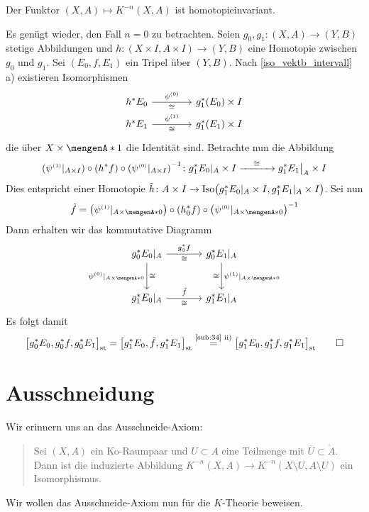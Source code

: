 \begin{lemma}[label=sub:36,{name=[Homotopieinvarinaz]}]
Der Funktor $(X,A) \mapsto K^{-n}(X,A)$ ist homotopieinvariant.
\end{lemma}
\begin{beweis}
Es genügt wieder, den Fall $n=0$ zu betrachten. Seien $g_0,g_1 \colon (X,A) \to (Y,B)$ stetige Abbildungen und $h \colon (X \times I,A \times I) \to (Y,B)$ eine Homotopie 
zwischen $g_0$ und $g_1$. Sei $(E_0,f,E_1)$ ein Tripel über $(Y,B)$. Nach \autoref{iso_vektb_intervall} a) existieren Isomorphismen
\[
	\begin{tikzcd}[column sep=4em, row sep=0.5em]
		h^* E_0 \rar["\psi^\ssbrace{0}","\cong"'] & g_1^*(E_0) \times I \\
		h^* E_1 \rar["\psi^\ssbrace{1}","\cong"'] & g_1^*(E_1) \times I
	\end{tikzcd}
\]
die über $X \times \set{1}$ die Identität sind. Betrachte nun die Abbildung
\[
	\enbrace*{\psi^\ssbrace{1}|_{A \times I}} \circ \enbrace*{h^* f} \circ \enbrace*{\psi^\ssbrace{0}|_{A \times I}} ^{-1} \colon g^*_1 E_0|_A \times I  
	\xrightarrow{\minwidthbox{\cong}{3em}} g_1^*E_1\big|_A \times I   
\]
Dies entspricht einer Homotopie $\tilde{h} \colon A \times I \to \Iso \enbrace[\big]{g_1^*E_0|_A \times I, g_1^* E_1|_A \times I}$. 
Sei nun
\[
	\tilde{f} = \enbrace*{\psi^\ssbrace{1}|_{A \times \set{0}}} \circ \enbrace*{h^*_0 f} \circ \enbrace*{\psi^\ssbrace{0}|_{A \times \set{0}}} ^{-1}
\]  
Dann erhalten wir das kommutative Diagramm
\[
	\begin{tikzcd}[sep=large]
		g_0^* E_0|_A \rar["g_0^*f","\cong"'] \dar["\psi^\ssbrace{0}|_{A \times \set{0}}"',"\cong"] & g_0^*E_1|_A \dar["\psi^\ssbrace{1}|_{A \times \set{0} }","\cong"'] \\
		g^*_1 E_0|_A \rar["\cong"',"\tilde{f}"] & g_1^* E_1|_A
	\end{tikzcd}
\]
Es folgt damit
\[
	\benbrace[\big]{g_0^* E_0, g^*_0 f , g^*_0 E_1}_\st = \benbrace[\big]{g_1^* E_0, \tilde{f}, g_1^* E_1}_\st \stackrel{\mbox{\scriptsize \ref{sub:34} ii)}}{=}
	\benbrace[\big]{g_1^* E_0, g_1^* f, g_1^* E_1}_\st \qedhere
\]	
\end{beweis}

\section*{Ausschneidung}
Wir erinnern uns an das Ausschneide-Axiom:
\begin{quote}
Sei $(X,A)$ ein Ko-Raumpaar und $U \subset A$ eine Teilmenge mit $\overline{U} \subset \mathring{A}$. Dann ist die induzierte Abbildung 
$K^{-n}(X,A) \to K^{-n}(X \setminus U, A \setminus U)$ ein Isomorphismus.	
\end{quote}
Wir wollen das Ausschneide-Axiom nun für die $K$-Theorie beweisen.

